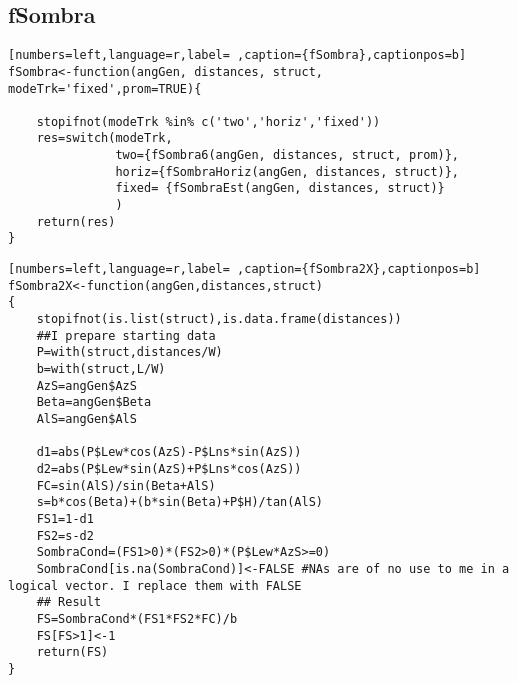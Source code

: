 \subsection{fSombra}
\label{sec:org5498afc}
\label{subsec:fsombra}
\begin{lstlisting}[numbers=left,language=r,label= ,caption={fSombra},captionpos=b]
fSombra<-function(angGen, distances, struct, modeTrk='fixed',prom=TRUE){

    stopifnot(modeTrk %in% c('two','horiz','fixed'))
    res=switch(modeTrk, 
               two={fSombra6(angGen, distances, struct, prom)},
               horiz={fSombraHoriz(angGen, distances, struct)},
               fixed= {fSombraEst(angGen, distances, struct)}
               )
    return(res)
}
\end{lstlisting}
\begin{lstlisting}[numbers=left,language=r,label= ,caption={fSombra2X},captionpos=b]
fSombra2X<-function(angGen,distances,struct)
{
    stopifnot(is.list(struct),is.data.frame(distances))
    ##I prepare starting data	
    P=with(struct,distances/W)
    b=with(struct,L/W)
    AzS=angGen$AzS
    Beta=angGen$Beta
    AlS=angGen$AlS

    d1=abs(P$Lew*cos(AzS)-P$Lns*sin(AzS))
    d2=abs(P$Lew*sin(AzS)+P$Lns*cos(AzS))
    FC=sin(AlS)/sin(Beta+AlS)
    s=b*cos(Beta)+(b*sin(Beta)+P$H)/tan(AlS)
    FS1=1-d1
    FS2=s-d2
    SombraCond=(FS1>0)*(FS2>0)*(P$Lew*AzS>=0)
    SombraCond[is.na(SombraCond)]<-FALSE #NAs are of no use to me in a logical vector. I replace them with FALSE
    ## Result
    FS=SombraCond*(FS1*FS2*FC)/b
    FS[FS>1]<-1
    return(FS)
}	
\end{lstlisting}
